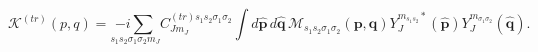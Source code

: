 \begin{equation}
\mathcal{K}^{\left( tr\right) }(p,q)=\underset{s_{1}s_{2}\sigma _{1}\sigma
_{2}m_{J}}{-i\sum }C_{Jm_{J}}^{\left( tr\right) s_{1}s_{2}\sigma _{1}\sigma
_{2}}\int d\hat{\mathbf{p}}\,d\hat{\mathbf{q}}\,\mathcal{M}%
_{s_{1}s_{2}\sigma _{1}\sigma _{2}}\left( \mathbf{p,q}\right)
Y_{J}^{m_{s_{1}s_{2}}\ast }(\hat{\mathbf{p}})Y_{J}^{m_{\sigma _{1}\sigma
_{2}}}(\hat{\mathbf{q}}).
\end{equation}

